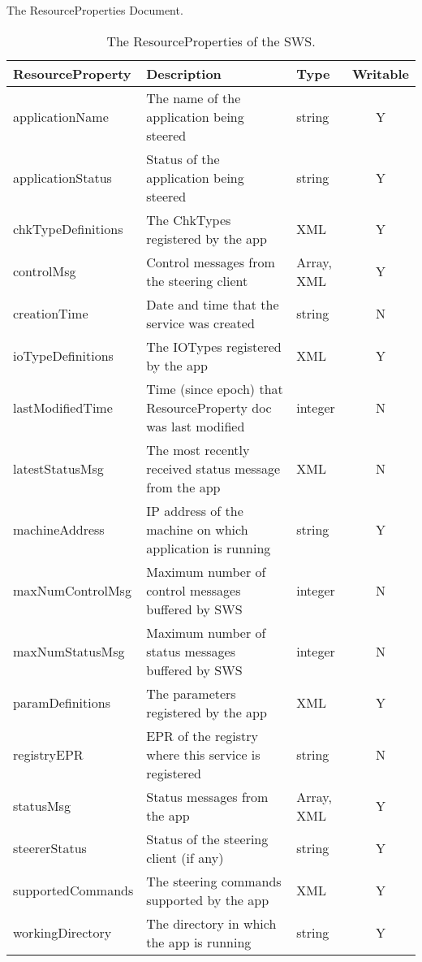 \documentclass[a4paper]{article}
\begin{document}
\begin{section}{The ResourceProperties Document.}
\begin{table}
\begin{center}
\begin{tabular}{l|p{5cm}|l|c}
\hline\hline
ResourceProperty   & Description & Type & Writable\\
\hline
applicationName    & The name of the application being steered & string & Y\\
applicationStatus  & Status of the application being steered & string & Y\\
chkTypeDefinitions & The ChkTypes registered by the app & XML & Y\\
controlMsg         & Control messages from the steering client & Array, XML & Y\\
creationTime       & Date and time that the service was created & string & N\\
ioTypeDefinitions  & The IOTypes registered by the app & XML & Y \\
lastModifiedTime   & Time (since epoch) that ResourceProperty doc was last modified & integer & N\\
latestStatusMsg    & The most recently received status message from the app & XML & N\\
machineAddress     & IP address of the machine on which application is running & string & Y\\
maxNumControlMsg   & Maximum number of control messages buffered by SWS & integer & N\\
maxNumStatusMsg    & Maximum number of status messages buffered by SWS & integer & N\\
paramDefinitions   & The parameters registered by the app & XML & Y\\
registryEPR        & EPR of the registry where this service is registered & string & N\\
statusMsg          & Status messages from the app & Array, XML & Y\\
steererStatus      & Status of the steering client (if any) & string & Y\\
supportedCommands  & The steering commands supported by the app & XML & Y\\
workingDirectory   & The directory in which the app is running & string & Y\\
\hline\hline
\end{tabular}
\end{center}
\caption{The ResourceProperties of the SWS.}
\label{tab:resourceProps}
\end{table}


\end{section}
\end{document}
